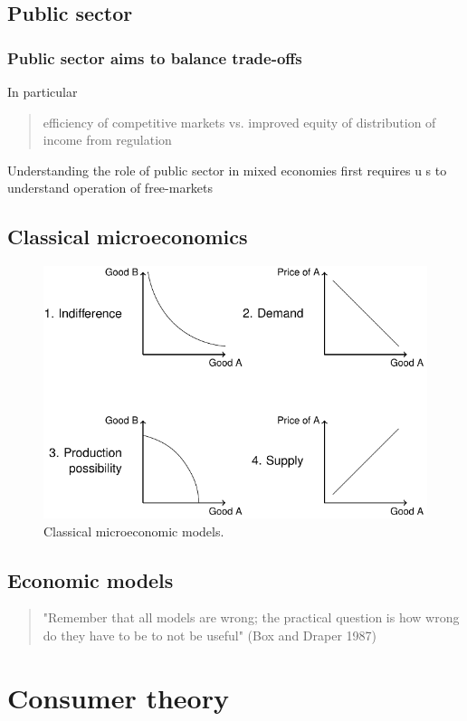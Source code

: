 \documentclass[class=report, crop=false, 12pt,a4paper]{standalone}
\begin{document}
\subsection{Public sector}
\subsubsection{Public sector aims to balance trade-offs}
In particular
\begin{quote}
	efficiency of competitive markets vs. improved equity of distribution of income from regulation
\end{quote}
Understanding the role of public sector in mixed economies first requires u s to understand operation of free-markets
\subsection{Classical microeconomics}
\begin{figure}[H]
	\centering
	\includegraphics[width = 0.9 \textwidth]{../img/figure3.png}
	\caption{Classical microeconomic models.}
\end{figure}
\subsection{Economic models}
\begin{quote}
	"Remember that all models are wrong; the practical question is how wrong do they have to be to not be useful" (Box and Draper 1987)
\end{quote}
\section{Consumer theory}
\end{document}
